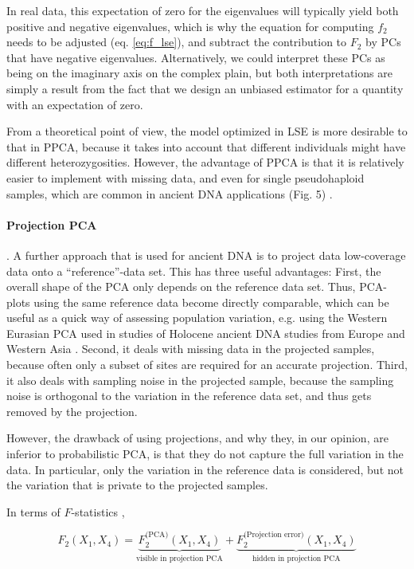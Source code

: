 \documentclass[12pt, letterpaper]{article}
\begin{document}
In real data, this expectation of zero for the eigenvalues will typically yield both positive and negative eigenvalues, which is why the equation for computing $f_2$ needs to be adjusted (eq. \ref{eq:f_lse}), and subtract the contribution to $F_2$ by PCs that have negative eigenvalues. Alternatively, we could interpret these PCs as being on the imaginary axis on the complex plain, but both interpretations are simply a result from the fact that we design an unbiased estimator for a quantity with an expectation of zero. 

From a theoretical point of view, the model optimized in LSE is more desirable to that in PPCA, because it takes into account that different individuals might have different heterozygosities. However, the advantage of PPCA is that it is relatively easier to implement with missing data, and even for single pseudohaploid samples, which are common in ancient DNA applications (Fig. 5) \cite{tipping_probabilistic_1999-1, orlando_ancient_2021}. 


\paragraph{Projection PCA}. A further approach that is used for ancient DNA is to project data low-coverage data onto a ``reference''-data set. This has three useful advantages: First, the overall shape of the PCA only depends on the reference data set. Thus, PCA-plots using the same reference data become directly comparable, which can be useful as a quick way of assessing population variation, e.g. using the Western Eurasian PCA used in studies of Holocene ancient DNA studies from Europe and Western Asia \citep{haak_massive_2015}. Second, it deals with missing data in the projected samples, because often only a subset of sites are required for an accurate projection. Third, it also deals with sampling noise in the projected sample, because the sampling noise is orthogonal to the variation in the reference data set, and thus gets removed by the projection.

However, the drawback of using projections, and why they, in our opinion, are inferior to probabilistic PCA, is that they do not capture the full variation in the data. In particular, only the variation in the reference data is considered, but not the variation that is private to the projected samples. 

In terms of $F$-statistics \cite{peter_geometric_2022}, 

\begin{equation*}
    F_2(X_1, X_4) = \underbrace{F_2^{\text{(PCA)}}(X_1, X_4)}_{\text{visible in projection PCA}} + \underbrace{F_2^{\text{(Projection error)}}(X_1, X_4)}_{\text{hidden in projection PCA}}
\end{equation*}
\end{document}

